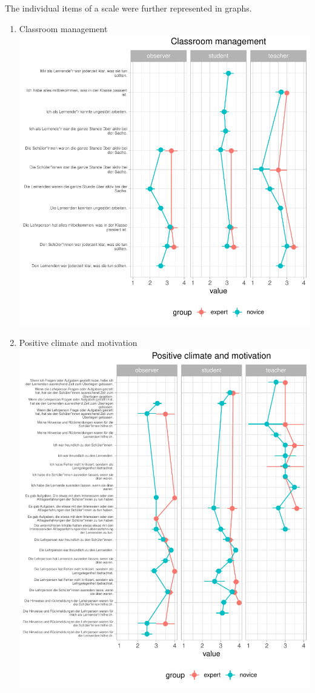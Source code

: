 \documentclass[
  english,
  man,floatsintext]{apa6}
\begin{document}
The individual items of a scale were further represented in graphs.

\begin{enumerate}
\def\labelenumi{(\arabic{enumi})}
\item
  Classroom management
  \includegraphics{paper_1_supplement_files/figure-latex/classroom management line plots-1.pdf}
\item
  Positive climate and motivation
  \includegraphics{paper_1_supplement_files/figure-latex/Positive climate and motivation line plots-1.pdf}

\end{enumerate}
\end{document}
